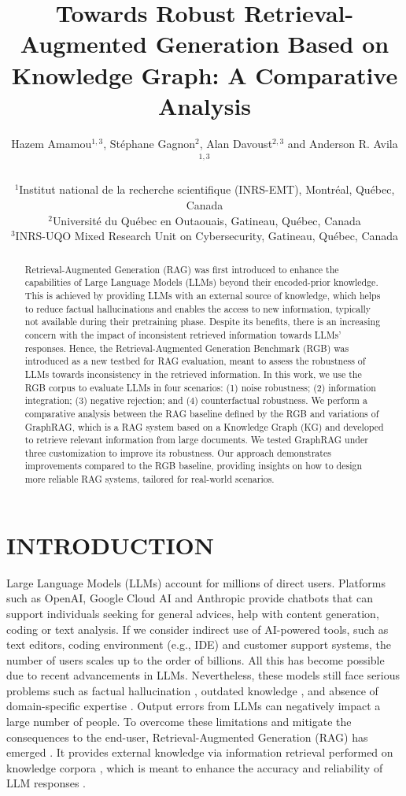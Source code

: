 \documentclass[letterpaper, 10 pt, conference]{ieeeconf}  %
\title{\LARGE \bf
Towards Robust Retrieval-Augmented Generation Based on Knowledge Graph: A Comparative Analysis
}
\author{Hazem Amamou$^{1, 3}$, Stéphane Gagnon$^{2}$, Alan Davoust$^{2, 3}$ and Anderson R. Avila$^{1, 3}$\\\\%
$^1$Institut national de la recherche scientifique (INRS-EMT), Montréal, Québec, Canada\\%
$^2$Université du Québec en Outaouais, Gatineau, Québec, Canada\\%
$^3$INRS-UQO Mixed Research Unit on Cybersecurity, Gatineau, Québec, Canada%
}
\begin{document}
\maketitle
\thispagestyle{empty}
\pagestyle{empty}


\begin{abstract}
Retrieval-Augmented Generation (RAG) was first introduced to enhance the capabilities of Large Language Models (LLMs) beyond their encoded-prior knowledge. This is achieved by providing LLMs with an external source of knowledge, which helps to reduce factual hallucinations and enables the access to new information, typically not available during their pretraining phase. Despite its benefits, there is an increasing concern with the impact of inconsistent retrieved information towards LLMs' responses. Hence, the Retrieval-Augmented Generation Benchmark (RGB) was introduced as a new testbed for RAG evaluation, meant to assess the robustness of LLMs towards inconsistency in the retrieved information. In this work, we use the RGB corpus to evaluate LLMs in four scenarios: (1) noise robustness; (2) information integration; (3) negative rejection; and (4) counterfactual robustness. We perform a comparative analysis between the RAG baseline defined by the RGB and variations of GraphRAG, which is a RAG system based on a Knowledge Graph (KG) and developed to retrieve relevant information from large documents. We tested GraphRAG under three customization to improve its robustness. Our approach demonstrates improvements compared to the RGB baseline, providing insights on how to design more reliable RAG systems, tailored for real-world scenarios.

\end{abstract}


\section{INTRODUCTION}

Large Language Models (LLMs) account for millions of direct users. Platforms such as OpenAI, Google Cloud AI and Anthropic provide chatbots that can support individuals seeking for general advices, help with content generation, coding or text analysis. If we consider indirect use of AI-powered tools, such as text editors, coding environment (e.g., IDE) and customer support systems, the number of users scales up to the order of billions. All this has become possible due to recent advancements in LLMs. Nevertheless, these models still face serious problems such as factual hallucination \cite{ji2023}, outdated knowledge \cite{wang2023knowledge}, and absence of domain-specific expertise \cite{shen2023}. Output errors from LLMs can negatively impact a large number of people. To overcome these limitations and mitigate the consequences to the end-user, Retrieval-Augmented Generation (RAG) has emerged \cite{lewis2020retrieval}. It provides external knowledge via information retrieval performed on knowledge corpora \cite{thakur2024knowing}, which is meant to enhance the accuracy and reliability of LLM responses \cite{gao2024retrieval}. 
\end{document}
